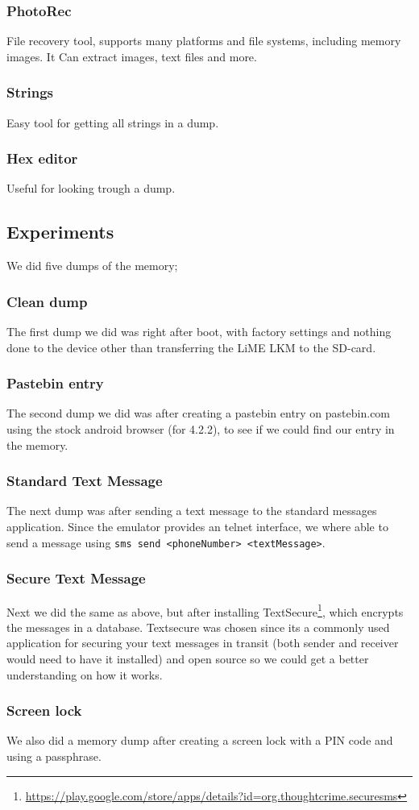   \subsubsection{PhotoRec}
  File recovery tool, supports many platforms and file systems, including memory images. 
  It Can extract images, text files and more.
  \subsubsection{Strings}
  Easy tool for getting all strings in a dump.
  \subsubsection{Hex editor}
  Useful for looking trough a dump.
\subsection{Experiments}
We did five dumps of the memory;
  \subsubsection{Clean dump}
  The first dump we did was right after boot, with factory settings and nothing done to the device 
  other than transferring the LiME LKM to the SD-card.
  \subsubsection{Pastebin entry}
  The second dump we did was after creating a pastebin entry on pastebin.com using the stock android browser (for 4.2.2),
  to see if we could find our entry in the memory.
  \subsubsection{Standard Text Message}
  The next dump was after sending a text message to the standard messages application. Since the emulator provides an telnet 
  interface, we where able to send a message using \texttt{sms send <phoneNumber> <textMessage>}.
  \subsubsection{Secure Text Message}
  Next we did the same as above, but after installing 
  TextSecure\footnote{\url{https://play.google.com/store/apps/details?id=org.thoughtcrime.securesms}}, 
  which encrypts the messages in a database. Textsecure was chosen since its a commonly used application for securing your text 
  messages in transit (both sender and receiver would need to have it installed) and open source so we could get a better understanding 
  on how it works. 
  \subsubsection{Screen lock}
  We also did a memory dump after creating a screen lock with a PIN code and using a passphrase.
